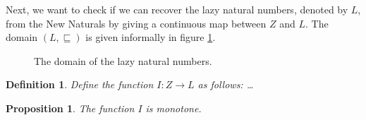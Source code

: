 \documentclass[a4paper]{article}
\newcommand{\arr}{\rightarrow}
\newtheorem{defIMapsNuFToL}[defNuF]{Definition}
\newtheorem{thmIIsMonotone}[defNuF]{Proposition}
\begin{document}
Next, we want to check if we can recover the lazy natural numbers, denoted by
$L$, from the New Naturals by giving a continuous map between $Z$ and $L$.
The domain $(L, \sqsubseteq)$ is given informally in figure
\ref{fig:DomainOfLazyNaturals}.


\begin{figure}
\begin{center}
\end{center}
\caption{The domain of the lazy natural numbers.}
\label{fig:DomainOfLazyNaturals}
\end{figure}

\begin{defIMapsNuFToL}

Define the function $I : Z \arr L$ as follows: \ldots

\end{defIMapsNuFToL}


\begin{thmIIsMonotone}

The function $I$ is monotone.

\end{thmIIsMonotone}
\end{document}
